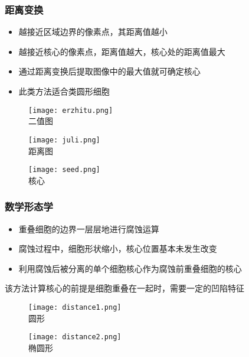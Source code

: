 \documentclass[notheorems,mathserif,table,compress]{beamer}  %
\begin{document}
\begin{frame}
  \frametitle{距离变换}
  \begin{itemize}
  \item 越接近区域边界的像素点，其距离值越小
  \item 越接近核心的像素点，距离值越大，核心处的距离值最大
  \item 通过距离变换后提取图像中的最大值就可确定核心
  \item 此类方法适合类圆形细胞
  \end{itemize}
  \begin{figure}
   \begin{minipage}[t]{0.3\textwidth} 
     \centering 
     \texttt{[image: erzhitu.png]} \\
     二值图
   \end{minipage}
   \begin{minipage}[t]{0.4\textwidth} 
     \centering 
     \texttt{[image: juli.png]} \\
     距离图
   \end{minipage}
   \begin{minipage}[b]{0.3\textwidth} 
     \centering 
     \texttt{[image: seed.png]} \\
     核心
   \end{minipage}
   \end{figure}
\end{frame}



\begin{frame}
  \frametitle{数学形态学}
  \begin{itemize}
  \item 重叠细胞的边界一层层地进行腐蚀运算
  \item 腐蚀过程中，细胞形状缩小，核心位置基本未发生改变
  \item 利用腐蚀后被分离的单个细胞核心作为腐蚀前重叠细胞的核心\newline
  \end{itemize}
  该方法计算核心的前提是细胞重叠在一起时，需要一定的凹陷特征
\end{frame}



\begin{frame}
  \begin{figure}
   \begin{minipage}[t]{0.5\textwidth} 
     \centering 
     \texttt{[image: distance1.png]} \\
     圆形
   \end{minipage}
   \begin{minipage}[t]{0.5\textwidth} 
     \centering 
     \texttt{[image: distance2.png]} \\
     椭圆形
   \end{minipage}
   \end{figure}
\end{frame}
\end{document}
